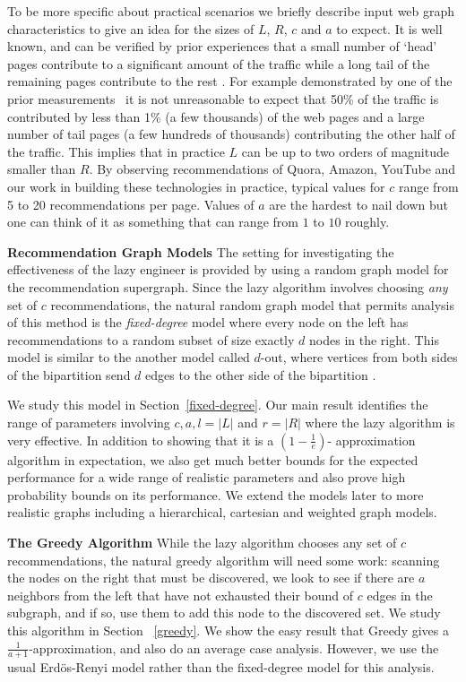 To be more specific about practical scenarios we briefly describe
input web graph characteristics to give an idea for the sizes of $L$,
$R$, $c$ and $a$ to expect. It is well known, and can be verified by
prior experiences that a small number of `head' pages contribute to a
significant amount of the traffic while a long tail of the remaining
pages contribute to the rest \cite{HubermanAdamic1999, DuDemmerBrewer2006}. For example
demonstrated by one of the prior measurements~\cite{KumarNorrisSun2009}
it is not unreasonable to expect that 50\% of the traffic is
contributed by less than 1\% (a few thousands) of the web pages and a
large number of tail pages (a few hundreds of thousands) contributing
the other half of the traffic. This implies that in practice $L$ can
be up to two orders of magnitude smaller than $R$.  By observing
recommendations of Quora, Amazon, YouTube and our work in building
these technologies in practice, typical values for $c$ range from 5 to
20 recommendations per page. Values of $a$ are the hardest to nail
down but one can think of it as something that can range from $1$ to
$10$ roughly.

{\bf Recommendation Graph Models} The setting for investigating the
effectiveness of the lazy engineer is provided by using a random graph
model for the recommendation supergraph. Since the lazy algorithm
involves choosing {\em any} set of $c$ recommendations, the natural
random graph model that permits analysis of this method is the {\em
  fixed-degree} model where every node on the left has recommendations
to a random subset of size exactly $d$ nodes in the right. This model is
similar to the another model called $d$-out, where vertices from both
sides of the bipartition send $d$ edges to the other side of the bipartition
\cite{FriezePittel2004}.

We study this model in Section~\ref{fixed-degree}. Our main result
identifies the range of parameters involving $c,a,l=|L|$ and $r =|R|$
where the lazy algorithm is very effective. In addition to showing
that it is a $(1-\frac1e)$- approximation algorithm in expectation, we
also get much better bounds for the expected performance for a wide
range of realistic parameters and also prove high probability bounds
on its performance. We extend the models later to more realistic
graphs including a hierarchical, cartesian and weighted graph
models. \vs

{\bf The Greedy Algorithm}
While the lazy algorithm chooses any set of $c$ recommendations, the natural
greedy algorithm will need some work: scanning the nodes on the right that must
be discovered, we look to see if there are $a$ neighbors from the left that have
not exhausted their bound of $c$ edges in the subgraph, and if so, use them to
add this node to the discovered set. We study this algorithm in Section
~\ref{greedy}. We show the easy result that Greedy gives a 
$\frac{1}{a+1}$-approximation, and also do an average case analysis. However, we
use the usual Erd\"os-Renyi model \cite{ErdosRenyi59}
rather than the fixed-degree model for this analysis.


